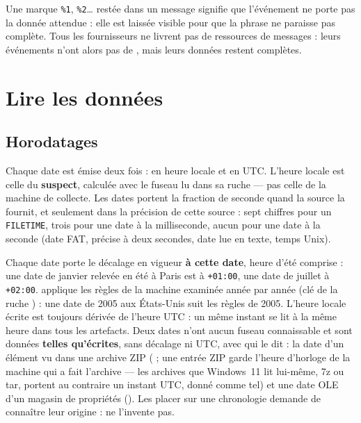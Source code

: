 \documentclass[11pt,a4paper,oneside]{report}
\begin{document}
\begin{note}
Une marque \texttt{\%1}, \texttt{\%2}\ldots{} restée dans un message signifie que
l'événement ne porte pas la donnée attendue : elle est laissée visible pour que la
phrase ne paraisse pas complète. Tous les fournisseurs ne livrent pas de
ressources de messages : leurs événements n'ont alors pas de
, mais leurs données restent complètes.
\end{note}

\chapter{Lire les données}\label{chap:lecture}

\section{Horodatages}

Chaque date est émise deux fois :  en heure locale et  en
UTC. L'heure locale est celle du \textbf{suspect}, calculée avec le fuseau lu
dans sa ruche  — pas celle de la machine de collecte. Les dates
portent la fraction de seconde quand la source la fournit, et seulement dans
la précision de cette source : sept chiffres pour un \texttt{FILETIME}, trois
pour une date à la milliseconde, aucun pour une date à la seconde (date FAT,
précise à deux secondes, date lue en texte, temps Unix).

Chaque date porte le décalage en vigueur \textbf{à cette date}, heure d'été
comprise : une date de janvier relevée en été à Paris est à \texttt{+01:00},
une date de juillet à \texttt{+02:00}. \wac{} applique les règles de la machine
examinée année par année (clé  de la ruche
) : une date de 2005 aux États-Unis suit les règles de 2005.
L'heure locale écrite est toujours dérivée de l'heure UTC : un même instant se
lit à la même heure dans tous les artefacts. Deux dates n'ont aucun fuseau
connaissable et sont données \textbf{telles qu'écrites}, sans décalage ni UTC,
avec  qui le dit : la date d'un élément vu dans une archive
ZIP ( ; une entrée ZIP garde l'heure d'horloge de la
machine qui a fait l'archive — les archives que Windows~11 lit lui-même, 7z
ou tar, portent au contraire un instant UTC, donné comme tel) et une date OLE d'un magasin de propriétés
(). Les placer sur une chronologie demande de connaître
leur origine : \wac{} ne l'invente pas.
\end{document}
